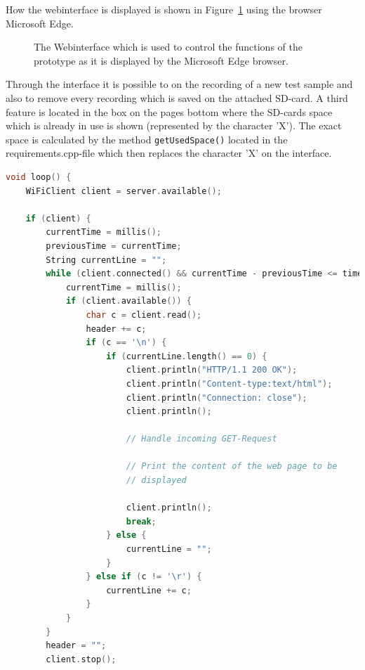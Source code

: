 How the webinterface is displayed is shown in Figure~\ref{fig:webinterface} using the browser Microsoft Edge.
\begin{figure}
	\caption{The Webinterface which is used to control the functions of the prototype as it is displayed by the Microsoft Edge browser.}
	\label{fig:webinterface}
\end{figure}
Through the interface it is possible to on the recording of a new test sample and also to remove every recording which is saved on the attached SD-card.
A third feature is located in the box on the pages bottom where the SD-cards space which is already in use is shown (represented by the character 'X').
The exact space is calculated by the method \texttt{getUsedSpace()} located in the requirements.cpp-file which then replaces the character 'X' on the interface. 
\begin{lstlisting}[frame=single, language={c++}, style=style,
	caption={The part of the loop-function which is used to manage the connection of a socket hosted on the microcontroller to a web-client.}, label={lst:WiFiCon},float=!htb]
void loop() {
	WiFiClient client = server.available();
	
	if (client) {
		currentTime = millis();
		previousTime = currentTime;
		String currentLine = "";
		while (client.connected() && currentTime - previousTime <= timeoutTime) {
			currentTime = millis();
			if (client.available()) {
				char c = client.read();
				header += c;
				if (c == '\n') {
					if (currentLine.length() == 0) {
						client.println("HTTP/1.1 200 OK");
						client.println("Content-type:text/html");
						client.println("Connection: close");
						client.println();
						
						// Handle incoming GET-Request
						
						// Print the content of the web page to be
						// displayed
						
						client.println();
						break;
					} else {
						currentLine = "";
					}
				} else if (c != '\r') {
					currentLine += c;
				}
			}
		}
		header = "";
		client.stop();
\end{lstlisting}

